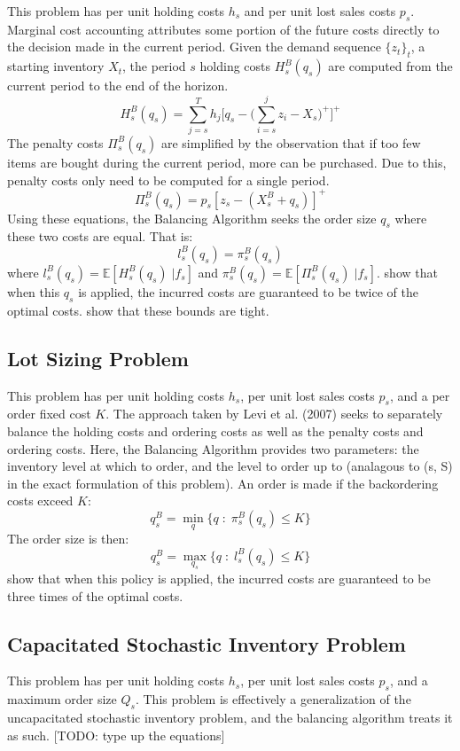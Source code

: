 \documentclass[12pt]{article}
\newcommand{\EX}{\mathbb{E}}
\begin{document}
This problem has per unit holding costs $h_s$ and per unit lost sales costs $p_s$. Marginal cost accounting attributes some portion of the future costs directly to the decision made in the current period. Given the demand sequence $\{z_t\}_t$, a starting inventory $X_t$, the period $s$ holding costs $H^B_s(q_s)$ are computed from the current period to the end of the horizon. 
$$
	H_s^B(q_s) = \sum_{j=s}^T h_j \big[q_s - \big(\sum_{i=s}^j z_i - X_s\big)^+\big]^+
$$
The penalty costs $\Pi_s^B(q_s)$ are simplified by the observation that if too few items are bought during the current period, more can be purchased. Due to this, penalty costs only need to be computed for a single period.
$$
	\Pi_s^B(q_s) =  p_s [z_s - (X_s^B + q_s)]^+ 
$$
Using these equations, the Balancing Algorithm seeks the order size $q_s$ where these two costs are equal. That is:
$$
	l_s^B(q_s) = \pi_s^B(q_s)
$$
where $l_s^B(q_s) = \EX[H_s^B(q_s) \; | f_s]$ and $\pi_s^B(q_s) = \EX[\Pi_s^B(q_s) \; | f_s]$. \cite{levi:2007} show that when this $q_s$ is applied, the incurred costs are guaranteed to be twice of the optimal costs. \cite{hurley:2007} show that these bounds are tight.

\subsection{Lot Sizing Problem}

This problem has per unit holding costs $h_s$, per unit lost sales costs $p_s$, and a per order fixed cost $K$. The approach taken by Levi et al. (2007) seeks to separately balance the holding costs and ordering costs as well as the penalty costs and ordering costs. Here, the Balancing Algorithm provides two parameters: the inventory level at which to order, and the level to order up to (analagous to (s, S) in the exact formulation of this problem). An order is made if the backordering costs exceed $K$:
$$
	q_s^B = \min_{q} \{q \; : \; \pi_s^B(q_s) \leq K\} 
$$
The order size is then:
$$
	q_s^B = \max_{q_s} \{q \; : \; l_s^B(q_s) \leq K\} 
$$
\cite{levi:2007} show that when this policy is applied, the incurred costs are guaranteed to be three times of the optimal costs.  

\subsection{Capacitated Stochastic Inventory Problem}

This problem has per unit holding costs $h_s$, per unit lost sales costs $p_s$, and a maximum order size $Q_s$. This problem is effectively a generalization of the uncapacitated stochastic inventory problem, and the balancing algorithm treats it as such. 
[TODO: type up the equations]
\end{document}
